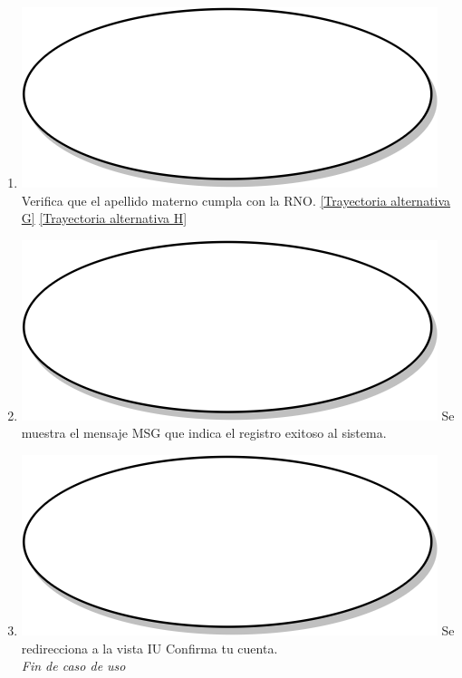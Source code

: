 \begin{enumerate}
  \item {\includegraphics[scale=.05]{Capitulo3/img/proceso.png} Verifica que el apellido materno cumpla con la RNO. \hyperref[cu2_ta_g]{[Trayectoria alternativa G]} \hyperref[cu2_ta_h]{[Trayectoria alternativa H]}}
  \item {\includegraphics[scale=.05]{Capitulo3/img/proceso.png} Se muestra el mensaje MSG que indica el registro exitoso al sistema.}
  \item {\includegraphics[scale=.1]{Capitulo3/img/proceso.png} Se redirecciona a la vista IU Confirma tu cuenta.}\\
  \textit{Fin de caso de uso} \\	
\end{enumerate}

